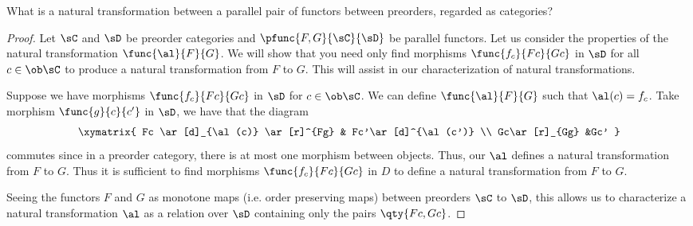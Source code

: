 \documentclass[main.tex]{subfiles}
\begin{document}
\begin{exercise}
	What is a natural transformation between a parallel pair of functors between
	preorders, regarded as categories?
\end{exercise}

\begin{proof}
	Let $\sC$ and $\sD$ be preorder categories and $\pfunc{F,G}{\sC}{\sD}$ be
	parallel functors. Let us consider the properties of the natural
	transformation $\func{\al}{F}{G}$. We will show that you need only find
	morphisms $\func{f_{c}}{Fc}{Gc}$ in $\sD$ for all $c \in \ob \sC$ to produce
	a natural transformation from $F$ to $G$. This will assist in our
	characterization of natural transformations.

	Suppose we have morphisms $\func{f_{c}}{Fc}{Gc}$ in $\sD$ for $c \in \ob
	\sC$.  We can define $\func{\al}{F}{G}$ such that $\al(c) = f_{c}$. Take
	morphism $\func{g}{c}{c'}$ in $\sD$, we have that the diagram
	\[\xymatrix{ Fc \ar[d]_{\al(c)} \ar[r]^{Fg} & Fc'\ar[d]^{\al(c')}  \\
	Gc\ar[r]_{Gg} &Gc'   }\]
	commutes since in a preorder category, there is at most one
	morphism between objects. Thus, our $\al$ defines a natural
	transformation from $F$ to $G$. Thus it is sufficient to find morphisms
	$\func{f_{c}}{Fc}{Gc}$ in $D$ to define a natural transformation from
	$F$ to $G$.

	Seeing the functors $F$ and $G$ as monotone maps (i.e. order preserving
	maps) between preorders $\sC$ to $\sD$, this allows us to characterize a
	natural transformation $\al$ as a relation over $\sD$ containing only the
	pairs $\qty{Fc,Gc}$.
\end{proof}
\end{document}
